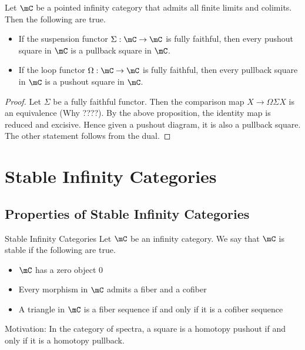 \documentclass[a4paper]{article}
\begin{document}
\begin{prp}{}{} Let $\mC$ be a pointed infinity category that admits all finite limits and colimits. Then the following are true. 
\begin{itemize}
\item If the suspension functor $\Sigma:\mC\to\mC$ is fully faithful, then every pushout square in $\mC$ is a pullback square in $\mC$. 
\item If the loop functor $\Omega:\mC\to\mC$ is fully faithful, then every pullback square in $\mC$ is a pushout square in $\mC$. 
\end{itemize} \tcbline
\begin{proof}
Let $\Sigma$ be a fully faithful functor. Then the comparison map $X\to\Omega\Sigma X$ is an equivalence (Why ????). By the above proposition, the identity map is reduced and excisive. Hence given a pushout diagram, it is also a pullback square. The other statement follows from the dual. 
\end{proof}
\end{prp}

\pagebreak
\section{Stable Infinity Categories}
\subsection{Properties of Stable Infinity Categories}
\begin{defn}{Stable Infinity Categories}{} Let $\mC$ be an infinity category. We say that $\mC$ is stable if the following are true. 
\begin{itemize}
\item $\mC$ has a zero object $0$
\item Every morphism in $\mC$ admits a fiber and a cofiber
\item A triangle in $\mC$ is a fiber sequence if and only if it is a cofiber sequence
\end{itemize}
\end{defn}

Motivation: In the category of spectra, a square is a homotopy pushout if and only if it is a homotopy pullback. 
\end{document}
